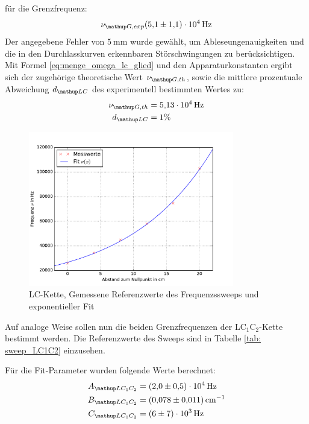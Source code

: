 für die Grenzfrequenz:
\begin{equation}
  \nu\ua{G, exp}\SI{5.1(11)e4}{\hertz}
  \label{eq: nu_g_LC}
\end{equation}
Der angegebene Fehler von $\SI{5}{\milli\meter}$ wurde gewählt, um Ableseungenauigkeiten und die in den Durchlasskurven
erkennbaren Störschwingungen zu berücksichtigen.
Mit Formel \eqref{eq:menge_omega_lc_glied} und den Apparaturkonstanten ergibt sich der zugehörige theoretische Wert $\nu\ua{G, th}$, sowie die
mittlere prozentuale Abweichung $d\ua{LC}$ des experimentell bestimmten Wertes zu:
\begin{align}
  \nu\ua{G, th} &= \SI{5.13e4}{\hertz} \\
  d\ua{LC} &= 1 \%
\end{align}
\FloatBarrier
\begin{figure}
  \centering
  \includegraphics[width = 0.8\textwidth]{../Messdaten/plots/frequenzsweep_LC.pdf}
  \caption{LC-Kette, Gemessene Referenzwerte des Frequenzssweeps und exponentieller Fit}
  \label{fig: plot_sweep_LC}
\end{figure}
Auf analoge Weise sollen nun die beiden Grenzfrequenzen der $\mathup{LC_1C_2}$-Kette bestimmt werden. Die Referenzwerte
des Sweeps sind in Tabelle \ref{tab: sweep_LC1C2} einzusehen.
\FloatBarrier

Für die Fit-Parameter wurden folgende Werte berechnet:
\begin{align}
  \begin{aligned}
    A\ua{LC_1C_2} &= \SI{2.0(5)e4}{\hertz}\\
    B\ua{LC_1C_2} &= \SI{0.078(11)}{\cm^{-1}}\\
    C\ua{LC_1C_2} &= \SI{6(7)e3}{\hertz}
  \end{aligned}
  \label{eq: params_LC1C2}
\end{align}
